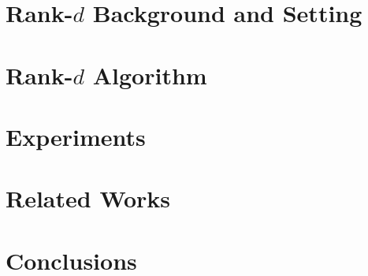 \documentclass{article}
\begin{document}
\section{Rank-$d$ Background and Setting}
\label{sec:setting}


\section{Rank-$d$ Algorithm}
\label{sec:algorithm}


\section{Experiments}
\label{sec:experiments}


\section{Related Works}
\label{sec:related}

\vspace*{-1em}
\section{Conclusions}
\label{sec:conclusions}





%
\end{document}
